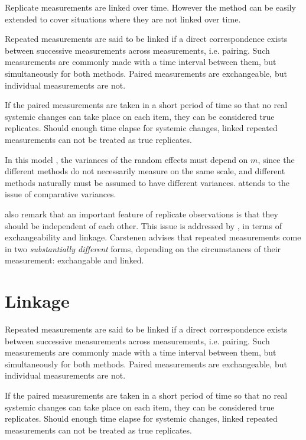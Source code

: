 \documentclass[12pt, a4paper]{report}
\theoremstyle{plain}
\theoremstyle{definition}
\theoremstyle{remark}
\begin{document}
	
	Replicate measurements are linked over time. However the method can be easily extended to cover situations where they are not linked over time.
	
	Repeated measurements are said to be linked if a direct correspondence exists between successive measurements across measurements, i.e. pairing. Such measurements are commonly made with a time interval between them, but simultaneously for both methods. Paired measurements are exchangeable, but individual measurements are not.
	
	If the paired measurements are taken
	in a short period of time so that no real systemic changes can take place on each item, they can be considered true replicates.
	Should enough time elapse for systemic changes, linked repeated measurements can not be treated as true replicates.
	
	
	
	
	In this model , the variances of the random effects must depend on
	$m$, since the different methods do not necessarily measure on the
	same scale, and different methods naturally must be assumed to
	have different variances. \citet{BXC2004} attends to the issue of
	comparative variances.
	

		
	\bigskip
	\citet{BA99} also remark that an important feature of replicate observations is that they should be independent
	of each other. This issue is addressed by \citet{BXC2010}, in terms of exchangeability and linkage. Carstenen advises that repeated measurements come in two \emph{substantially different} forms, depending on the circumstances of their measurement: exchangable and linked.
	\section{Linkage}
	Repeated measurements are said to be linked if a direct correspondence exists between successive measurements across measurements, i.e. pairing. Such measurements are commonly made with a time interval between them, but simultaneously for both methods. Paired measurements are exchangeable, but individual measurements are not.
	
	If the paired measurements are taken
	in a short period of time so that no real systemic changes can take place on each item, they can be considered true replicates.
	Should enough time elapse for systemic changes, linked repeated measurements can not be treated as true replicates.
	
\end{document}
